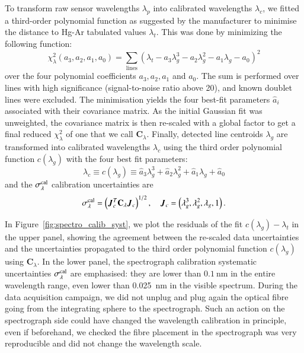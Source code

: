 To transform raw sensor wavelengths $\lambda_p$ into calibrated wavelengths $\lambda_c$, we fitted a third-order polynomial function as suggested by the manufacturer to minimise the distance to Hg-Ar tabulated values $\lambda_t$. This was done by minimizing the following function: 
\begin{equation}
    \chi_\lambda^2(a_3, a_2, a_1, a_0) = \sum_{\text{lines}} \left(\lambda_t-a_3 \lambda_g^3 - a_2 \lambda_g^2-a_1 \lambda_g -a_0\right)^2
\end{equation}
over the four polynomial coefficients $a_3, a_2, a_1$ and $a_0$. The sum is performed over lines with high significance (signal-to-noise ratio above 20), and known doublet lines were excluded. The minimisation yields  the four best-fit parameters $\hat a_i$ associated with their covariance matrix. 
As the initial Gaussian fit was unweighted, the covariance matrix is then re-scaled with a global factor to get a final reduced $\chi_\lambda^2$ of one that we call $\mathbf{C}_\lambda$. 
Finally, detected line centroids $\lambda_g$ are transformed into calibrated wavelengths $\lambda_c$ using the third order polynomial function $c(\lambda_g)$ with the four best fit parameters:  
\begin{equation}
    \lambda_c \equiv c(\lambda_g) \equiv \hat a_3 \lambda_g^3 + \hat a_2 \lambda_g^2+\hat a_1 \lambda_g +\hat a_0
\end{equation}
and the $\sigma_\lambda^{\rm cal}$ calibration uncertainties are
\begin{equation}
    \sigma_\lambda^{\rm cal} = \left(\vec J_c^T \mathbf{C}_\lambda \vec J_c\right)^{1/2},\quad \vec J_c = \left(\lambda_g^3, \lambda_g^2, \lambda_g, 1\right).
\end{equation}

In Figure~\ref{fig:spectro_calib_syst}, we plot the residuals of the fit $c(\lambda_g)-\lambda_t$ in the upper panel, showing the agreement between the re-scaled data uncertainties and the uncertainties propagated to the third order polynomial function $c(\lambda_g)$ using $\mathbf{C}_\lambda$. In the lower panel, the spectrograph calibration systematic uncertainties $\sigma_\lambda^{\rm cal}$ are emphasised: they are lower than $\SI{0.1}{\nm}$ in the entire wavelength range, even lower than \SI{0.025}{\nm} in the visible spectrum. During the data acquisition campaign, we did not unplug and plug again the optical fibre going from the integrating sphere to the spectrograph. Such an action on the spectrograph side could have changed the wavelength calibration in principle, even if beforehand, we checked the fibre placement in the spectrograph was very reproducible and did not change the wavelength scale. 

